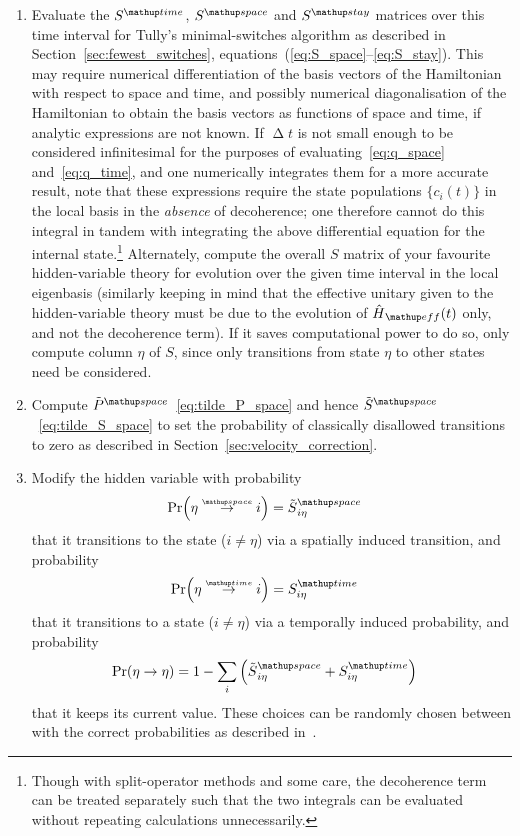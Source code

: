 \begin{enumerate}
    \item Evaluate the $S^\up{time}$, $S^\up{space}$ and $S^\up{stay}$ matrices over this time interval for Tully's minimal-switches algorithm as described in Section~\ref{sec:fewest_switches}, equations~(\ref{eq:S_space}--\ref{eq:S_stay}). This may require numerical differentiation of the basis vectors of the Hamiltonian with respect to space and time, and possibly numerical diagonalisation of the Hamiltonian to obtain the basis vectors as functions of space and time, if analytic expressions are not known. If $\upDelta t$ is not small enough to be considered infinitesimal for the purposes of evaluating~\eqref{eq:q_space} and~\eqref{eq:q_time}, and one numerically integrates them for a more accurate result, note that these expressions require the state populations $\{c_i(t)\}$ in the local basis in the \emph{absence} of decoherence; one therefore cannot do this integral in tandem with integrating the above differential equation for the internal state.\footnote{Though with split-operator methods and some care, the decoherence term can be treated separately such that the two integrals can be evaluated without repeating calculations unnecessarily.} Alternately, compute the overall $S$ matrix of your favourite hidden-variable theory for evolution over the given time interval in the local eigenbasis (similarly keeping in mind that the effective unitary given to the hidden-variable theory must be due to the evolution of $\hat H_\up{eff}(t)$ only, and not the decoherence term). If it saves computational power to do so, only compute column $\eta$ of $S$, since only transitions from state $\eta$ to other states need be considered.

    \item Compute $\tilde P^\up{space}$~\eqref{eq:tilde_P_space} and hence $\tilde S^\up{space}$~\eqref{eq:tilde_S_space} to set the probability of classically disallowed transitions to zero as described in Section~\ref{sec:velocity_correction}.

    \item Modify the hidden variable with probability
    \begin{align}
    \Pr(\eta\toverset{\up{space}}\rightarrow i) &= \tilde S^\up{space}_{i\eta}
    \end{align}
    that it transitions to the state ($i\neq\eta$) via a spatially induced transition, and probability
    \begin{align}
    \Pr(\eta\toverset{\up{time}}\rightarrow i) &= S^\up{time}_{i\eta}
    \end{align}
    that it transitions to a state ($i\neq\eta$) via a temporally induced probability, and probability
    \begin{align}
    \Pr(\eta\rightarrow\eta) &= 1 - \sum_i \left(\tilde S^\up{space}_{i\eta} + S^\up{time}_{i\eta}\right)
    \end{align}
    that it keeps its current value. These choices can be randomly chosen between with the correct probabilities as described in~.


\end{enumerate}

